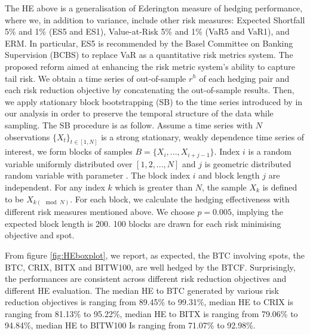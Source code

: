 The HE above is a generalisation of Ederington measure of hedging performance, where we,
in addition to variance, include other risk measures: Expected Shortfall 5\% and 1\% (ES5 and ES1), Value-at-Risk 5\% and 1\% (VaR5 and VaR1), and ERM.
In particular, ES5 is recommended by the Basel Committee on Banking Supervision (BCBS) to replace VaR as a quantitative risk metrics system.
The proposed reform aimed at enhancing the risk metric system's ability to capture tail risk. \medskip
%
We obtain a time series of out-of-sample $r^h$ of each hedging pair and each risk reduction objective by concatenating the out-of-sample results.
Then, we apply stationary block bootstrapping (SB) to the time series introduced by \cite{Politis1994} in our analysis in order to preserve the temporal structure of the data while sampling.
The SB procedure is as follow.
Assume a time series with $N$ observations $\{X_t\}_{t \in [1,N]}$ is a strong stationary, weakly dependence time series of interest,
we form blocks of samples $B = \{X_i, ..., X_{i+j-1}\}$.
Index $i$ is a random variable uniformly distributed over $[1,2,...,N]$ and $j$ is geometric distributed random variable with parameter .
The block index $i$ and block length $j$ are independent.
For any index $k$ which is greater than $N$, the sample $X_k$ is defined to be $X_{k(\mod N)}$.
For each block, we calculate the hedging effectiveness with different risk measures mentioned above.
We choose $p=0.005$, implying the expected block length is 200.
100 blocks are drawn for each risk minimising objective and spot. \medskip

From figure \ref{fig:HEboxplot}, we report, as expected, the BTC involving spots, the BTC, CRIX, BITX and BITW100, are well hedged by the BTCF.
Surprisingly, the performances are consistent across different risk reduction objectives and different HE evaluation.
The median HE to BTC generated by various risk reduction objectives is ranging from 89.45\% to 99.31\%, median HE to CRIX is ranging from 81.13\% to 95.22\%,
median HE to BITX is ranging from 79.06\% to 94.84\%, median HE to BITW100 Is ranging from 71.07\% to 92.98\%. \medskip

